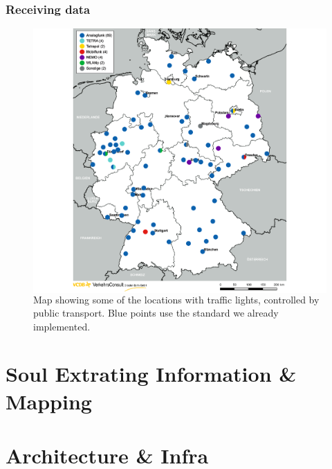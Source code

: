 \documentclass[aspectratio=169]{beamer}
\begin{document}
\begin{frame}
\frametitle{Receiving data}
\begin{figure}
\centering
\begin{columns}
\includegraphics[height=0.8\textheight]{figs/vcdb-map-ampelbeeinflussung.png}
\caption{Map showing some of the locations with traffic lights, controlled by public transport. Blue points use the standard we already implemented.}
\end{columns}
\end{figure}
\end{frame}


\section{Soul Extrating Information \& Mapping }




\section{Architecture \& Infra }
\end{document}
